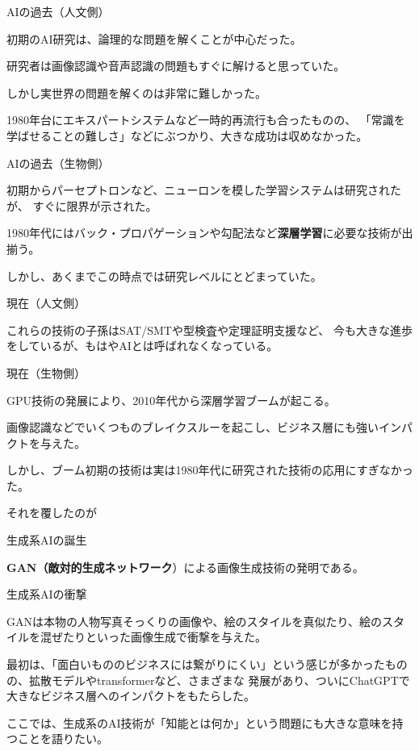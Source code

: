 \documentclass[12pt, unicode]{beamer}
\begin{document}
\begin{frame}{AIの過去（人文側）}

初期のAI研究は、論理的な問題を解くことが中心だった。

研究者は画像認識や音声認識の問題もすぐに解けると思っていた。

しかし実世界の問題を解くのは非常に難しかった。

1980年台にエキスパートシステムなど一時的再流行も合ったものの、
「常識を学ばせることの難しさ」などにぶつかり、大きな成功は収めなかった。

\end{frame}

\begin{frame}{AIの過去（生物側）}

初期からパーセプトロンなど、ニューロンを模した学習システムは研究されたが、
すぐに限界が示された。

1980年代にはバック・プロパゲーションや勾配法など\textbf{深層学習}に必要な技術が出揃う。

しかし、あくまでこの時点では研究レベルにとどまっていた。

\end{frame}

\begin{frame}{現在（人文側）}

これらの技術の子孫はSAT/SMTや型検査や定理証明支援など、
今も大きな進歩をしているが、もはやAIとは呼ばれなくなっている。

\end{frame}

\begin{frame}{現在（生物側）}

GPU技術の発展により、2010年代から深層学習ブームが起こる。

画像認識などでいくつものブレイクスルーを起こし、ビジネス層にも強いインパクトを与えた。

しかし、ブーム初期の技術は実は1980年代に研究された技術の応用にすぎなかった。

それを覆したのが

\end{frame}

\begin{frame}{生成系AIの誕生}

\textbf{GAN（敵対的生成ネットワーク}）による画像生成技術の発明である。

\end{frame}

\begin{frame}{生成系AIの衝撃}

GANは本物の人物写真そっくりの画像や、絵のスタイルを真似たり、絵のスタイルを混ぜたりといった画像生成で衝撃を与えた。

最初は、「面白いもののビジネスには繋がりにくい」という感じが多かったものの、拡散モデルやtransformerなど、さまざまな
発展があり、ついにChatGPTで大きなビジネス層へのインパクトをもたらした。

ここでは、生成系のAI技術が「知能とは何か」という問題にも大きな意味を持つことを語りたい。

\end{frame}
\end{document}
